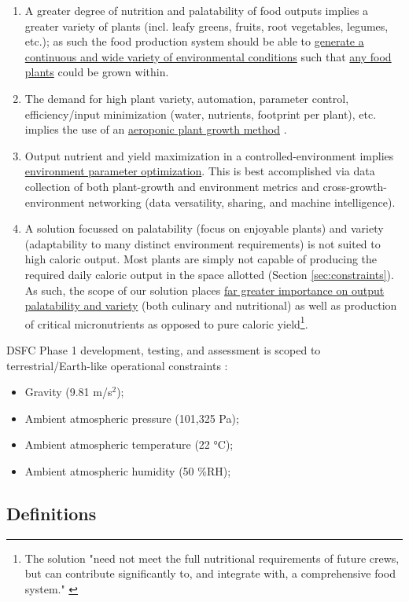 \documentclass{report}
\begin{document}
\begin{enumerate}[label=SC\arabic*., ref=SC\arabic*]
\newpage
\item \label{sc:5} A greater degree of nutrition and palatability of food outputs implies a greater variety of plants (incl. leafy greens, fruits, root vegetables, legumes, etc.); as such the food production system should be able to \uline{generate a continuous and wide variety of environmental conditions} such that \uline{any food plants} could be grown within.
\item \label{sc:6} The demand for high plant variety, automation, parameter control, efficiency/input minimization (water, nutrients, footprint per plant), etc. implies the use of an \uline{aeroponic plant growth method} \cite{spinoff}.
\item \label{sc:7} Output nutrient and yield maximization in a controlled-environment implies \uline{environment parameter optimization}. 
    This is best accomplished via data collection of both plant-growth and environment metrics and cross-growth-environment networking (data versatility, sharing, and machine intelligence).
\item \label{sc:8} A solution focussed on palatability (focus on enjoyable plants) and variety (adaptability to many distinct environment requirements) is not suited to high caloric output. 
    Most plants are simply not capable of producing the required daily caloric output in the space allotted (Section \ref{sec:constraints}). 
    As such, the scope of our solution places \uline{far greater importance on output palatability and variety} (both culinary and nutritional) as well as production of critical micronutrients as opposed to pure caloric 
    yield\footnote{The solution "need not meet the full nutritional requirements of future crews, but can contribute significantly to, and integrate with, a comprehensive food system." \cite{applicantguide}}.
\end{enumerate}
DSFC Phase 1 development, testing, and assessment is scoped to terrestrial/Earth-like operational constraints \cite{applicantguide,dsfc-phase2}:
\begin{itemize}
    \item Gravity (9.81 m/s${}^2$);
    \item Ambient atmospheric pressure (101,325 Pa);
    \item Ambient atmospheric temperature (22 °C);
    \item Ambient atmospheric humidity (50 \%RH);
\end{itemize}

\newpage
\subsection{Definitions}
\label{sec:definitions}
\end{document}
